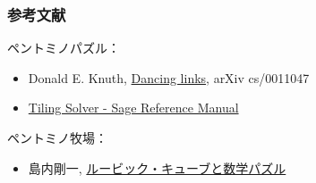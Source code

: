 \documentclass{beamer}
\begin{document}
\begin{frame}
    \frametitle{参考文献}

    ペントミノパズル：

    \begin{itemize}
        \item Donald E. Knuth, \href{https://arxiv.org/abs/cs/0011047}{Dancing links}, arXiv cs/0011047
        \item \href{https://doc.sagemath.org/html/en/reference/combinat/sage/combinat/tiling.html}{Tiling Solver - Sage Reference Manual}
    \end{itemize}

    ペントミノ牧場：

    \begin{itemize}
        \item 島内剛一, \href{https://www.amazon.co.jp/dp/4535785376/ref=nosim?tag=usamik-22}{ルービック・キューブと数学パズル}
    \end{itemize}
\end{frame}
\end{document}
